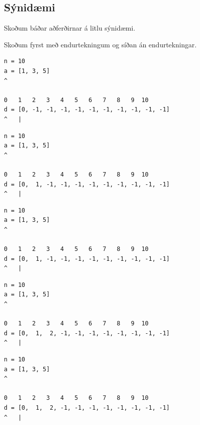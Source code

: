 \subsection{Sýnidæmi}
{
    {
        \item<1-> Skoðum báðar aðferðirnar á litlu sýnidæmi.
        \item<2-> Skoðum fyrst með endurtekningum og síðan án endurtekningar.
    }
}

\begin{frame}[fragile]
\begin{verbatim}
n = 10
a = [1, 3, 5]
^

0   1   2   3   4   5   6   7   8   9  10
d = [0, -1, -1, -1, -1, -1, -1, -1, -1, -1, -1]
^   |
\end{verbatim}
\end{frame}
\addtocounter{framenumber}{-1}

\begin{frame}[fragile]
\begin{verbatim}
n = 10
a = [1, 3, 5]
^

0   1   2   3   4   5   6   7   8   9  10
d = [0,  1, -1, -1, -1, -1, -1, -1, -1, -1, -1]
^   |
\end{verbatim}
\end{frame}
\addtocounter{framenumber}{-1}

\begin{frame}[fragile]
\begin{verbatim}
n = 10
a = [1, 3, 5]
^

0   1   2   3   4   5   6   7   8   9  10
d = [0,  1, -1, -1, -1, -1, -1, -1, -1, -1, -1]
^   |
\end{verbatim}
\end{frame}
\addtocounter{framenumber}{-1}

\begin{frame}[fragile]
\begin{verbatim}
n = 10
a = [1, 3, 5]
^

0   1   2   3   4   5   6   7   8   9  10
d = [0,  1,  2, -1, -1, -1, -1, -1, -1, -1, -1]
^   |
\end{verbatim}
\end{frame}
\addtocounter{framenumber}{-1}

\begin{frame}[fragile]
\begin{verbatim}
n = 10
a = [1, 3, 5]
^

0   1   2   3   4   5   6   7   8   9  10
d = [0,  1,  2, -1, -1, -1, -1, -1, -1, -1, -1]
^   |
\end{verbatim}
\end{frame}
\addtocounter{framenumber}{-1}

